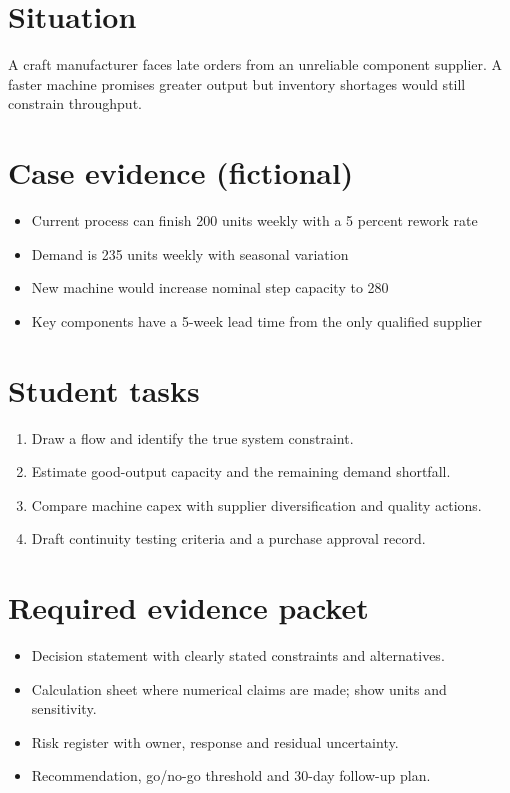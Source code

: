 \documentclass[11pt]{article}
\begin{document}
\SuiteOpen
\section{Situation}
A craft manufacturer faces late orders from an unreliable component supplier. A faster machine promises greater output but inventory shortages would still constrain throughput.
\section{Case evidence (fictional)}
\begin{itemize}[leftmargin=*,itemsep=3pt]
\item Current process can finish 200 units weekly with a 5 percent rework rate
\item Demand is 235 units weekly with seasonal variation
\item New machine would increase nominal step capacity to 280
\item Key components have a 5-week lead time from the only qualified supplier
\end{itemize}

\section{Student tasks}
\begin{enumerate}[leftmargin=*,itemsep=5pt]
\item Draw a flow and identify the true system constraint.
\item Estimate good-output capacity and the remaining demand shortfall.
\item Compare machine capex with supplier diversification and quality actions.
\item Draft continuity testing criteria and a purchase approval record.
\end{enumerate}

\section{Required evidence packet}
\begin{itemize}[leftmargin=*,itemsep=3pt]
\item Decision statement with clearly stated constraints and alternatives.
\item Calculation sheet where numerical claims are made; show units and sensitivity.
\item Risk register with owner, response and residual uncertainty.
\item Recommendation, go/no-go threshold and 30-day follow-up plan.
\end{itemize}
\end{document}
